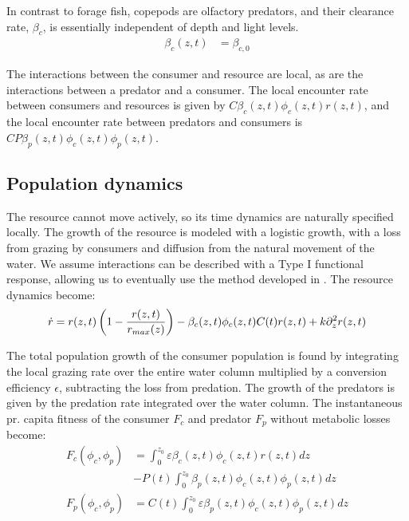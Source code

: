 In contrast to forage fish, copepods are olfactory predators, and their clearance rate, $\beta_c$, is essentially independent of depth and light levels.
\begin{align*}
	\beta_c(z,t) &=  \beta_{c,0}
\end{align*}

The interactions between the consumer and resource are local, as are the interactions between a predator and a consumer. The local encounter rate between consumers and resources is given by $C\beta_c(z,t)\phi_c(z,t)r(z,t)$, and the local encounter rate between predators and consumers is $CP\beta_p(z,t)\phi_c(z,t)\phi_p(z,t)$.

\subsection{Population dynamics}

The resource cannot move actively, so its time dynamics are naturally specified locally. The growth of the resource is modeled with a logistic growth, with a loss from grazing by consumers and diffusion from the natural movement of the water. We assume interactions can be described with a Type I functional response, allowing us to eventually use the method developed in . The resource dynamics become:
\begin{equation}
  \label{eq:res_dyn}
	\dot{r} = r(z,t)\pa{1-\frac{r(z,t)}{r_{max}(z)}} - \beta_c(z,t)\phi_c(z,t)C(t) r(z,t)  + k \partial_z^2 r(z,t) \\
\end{equation}

The total population growth of the consumer population is found by integrating the local grazing rate over the entire water column multiplied by a conversion efficiency $\epsilon$, subtracting the loss from predation. The growth of the predators is given by the predation rate integrated over the water column. The instantaneous pr. capita fitness of the consumer $F_c$ and predator $F_p$ without metabolic losses become:
\begin{equation}
  \begin{split}
	F_c(\phi_c, \phi_p) &= \int_0^{z_0} \varepsilon \beta_c(z,t)\phi_c(z,t)r(z,t) dz\\ &- P(t)\int_0^{z_0} \beta_p(z,t) \phi_c(z,t) \phi_p(z,t)dz \\
	F_p(\phi_c, \phi_p) &=  C(t) \int_0^{z_0} \varepsilon \beta_p(z,t)\phi_c(z,t)\phi_p(z,t) dz
  \end{split}
  \label{eq:fitness}
\end{equation}


